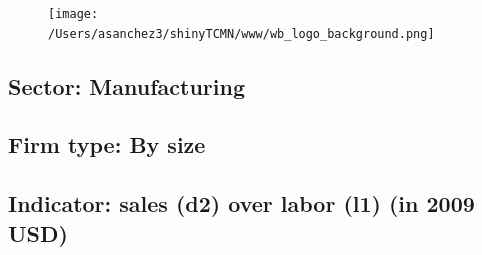 \documentclass{article}\usepackage[]{graphicx}\usepackage[]{color}
\begin{document}
%

\begin{figure}
  \vspace{-3ex} %
  \hspace{-7ex} %
  \texttt{[image: /Users/asanchez3/shinyTCMN/www/wb\_logo\_background.png]}
\end{figure}
 \begin{minipage}[t]{1.1\textwidth} %
      \vspace{-30ex}
      \hspace{10ex}
  \end{minipage}
  
%
\begin{minipage}[t]{0.99\textwidth} %
  \vspace{-0.5cm}
      \subsection*{\color{white!40!black}Sector: \color{blue!40!black}Manufacturing}
      \subsection*{\color{white!40!black}Firm type: \color{blue!40!black}By size}
      \subsection*{\color{white!40!black}Indicator: \color{blue!40!black}sales (d2) over labor (l1) (in 2009 USD)}
  \end{minipage} %
\end{document}
